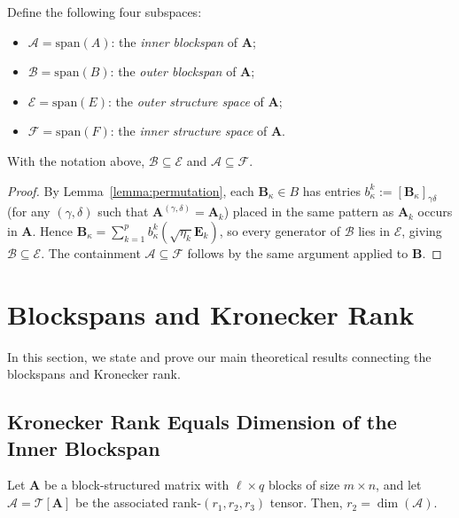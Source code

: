 \documentclass{siamart251216}
\newcommand{\tens}[1]{\mathbf{\mathcal{#1}}}
\def\bA{\mathbf{A}}
\def\bB{\mathbf{B}}
\def\bE{\mathbf{E}}
\begin{document}
\begin{definition}
\label{def:subspaces}
Define the following four subspaces:
\begin{itemize}
    \item $\mathscr{A} = \mathrm{span}(A)$: the \emph{inner blockspan} of $\bA$;
    \item $\mathscr{B} = \mathrm{span}(B)$: the \emph{outer blockspan} of $\bA$; 
    \item $\mathscr{E} = \mathrm{span}(E)$: the \emph{outer structure space} of $\bA$;
    \item $\mathscr{F} = \mathrm{span}(F)$: the \emph{inner structure space} of $\bA$.
\end{itemize}
\end{definition}

\begin{proposition}
\label{lemma:subspace_containment}
With the notation above, $\mathscr{B}\subseteq\mathscr{E}$ and $\mathscr{A}\subseteq\mathscr{F}$.
\end{proposition}

\begin{proof}
By Lemma~\ref{lemma:permutation}, each $\bB_\kappa\in B$ has entries
$b_\kappa^k := [\bB_\kappa]_{\gamma\delta}$ (for any $(\gamma,\delta)$ such that
$\bA^{(\gamma,\delta)}=\bA_k$) placed in the same pattern as $\bA_k$ occurs in $\bA$.  Hence
$\bB_\kappa = \sum_{k=1}^p b_\kappa^k(\sqrt{\eta_k}\bE_k)$, so every generator of $\mathscr{B}$
lies in $\mathscr{E}$, giving $\mathscr{B}\subseteq\mathscr{E}$.  The containment
$\mathscr{A}\subseteq\mathscr{F}$ follows by the same argument applied to $\bB$.
\end{proof}

\section{Blockspans and Kronecker Rank}
\label{sec:in_and_out}
In this section, we state and prove our main theoretical results connecting the blockspans and Kronecker rank.

\subsection{Kronecker Rank Equals Dimension of the Inner Blockspan}

\begin{theorem}
\label{thm:r2=dimC}
Let $\bA$ be a block-structured matrix with $\ell\times q$ blocks of size $m\times n$, and let
$\tens{A} = \mathcal{T}[\bA]$ be the associated rank-$(r_1,r_2,r_3)$ tensor.  Then,
$r_2 = \dim(\mathscr{A})$.
\end{theorem}
\end{document}
